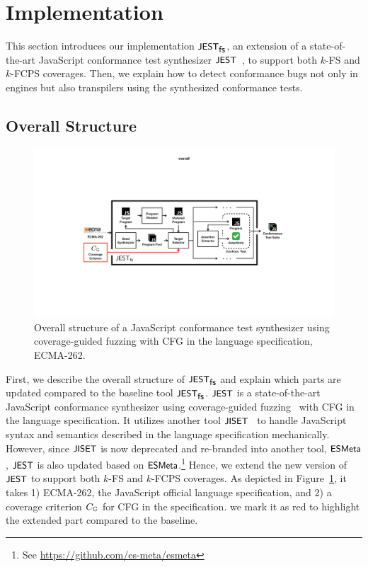 \section{Implementation}\label{sec:impl}

This section introduces our implementation $\textsf{\small JEST}_{\textsf{\small fs}}$, an extension of a
state-of-the-art JavaScript conformance test synthesizer $\textsf{\small JEST}$~\cite{jest}, to
support both $k$-FS and $k$-FCPS coverages.
%
Then, we explain how to detect conformance bugs not only in engines but also
transpilers using the synthesized conformance tests.


\subsection{Overall Structure}\label{sec:overall}

\begin{figure}
  \includegraphics[width=\textwidth]{img/overall}
  \caption{
    Overall structure of a JavaScript conformance test synthesizer using
    coverage-guided fuzzing with CFG in the language specification, ECMA-262.
  }
  \label{fig:overall}
\end{figure}


First, we describe the overall structure of $\textsf{\small JEST}_{\textsf{\small fs}}$ and explain which parts are
updated compared to the baseline tool $\textsf{\small JEST}_{\textsf{\small fs}}$.
%
$\textsf{\small JEST}$ is a state-of-the-art JavaScript conformance synthesizer using
coverage-guided fuzzing~\cite{afl} with CFG in the language specification.
%
It utilizes another tool $\textsf{\small JISET}$~\cite{jiset} to handle JavaScript syntax and
semantics described in the language specification mechanically.
%
However, since $\textsf{\small JISET}$ is now deprecated and re-branded into another tool,
$\textsf{\small ESMeta}$, $\textsf{\small JEST}$ is also updated based on $\textsf{\small ESMeta}$.\footnote{See
\url{https://github.com/es-meta/esmeta}}
%
Hence, we extend the new version of $\textsf{\small JEST}$ to support both $k$-FS and $k$-FCPS
coverages.
%
As depicted in Figure~\ref{fig:overall}, it takes 1) ECMA-262, the JavaScript
official language specification, and 2) a coverage criterion $C_{\mathbb{G}}$ for
CFG in the specification.
%
we mark it as red to highlight the extended part compared to the baseline.

